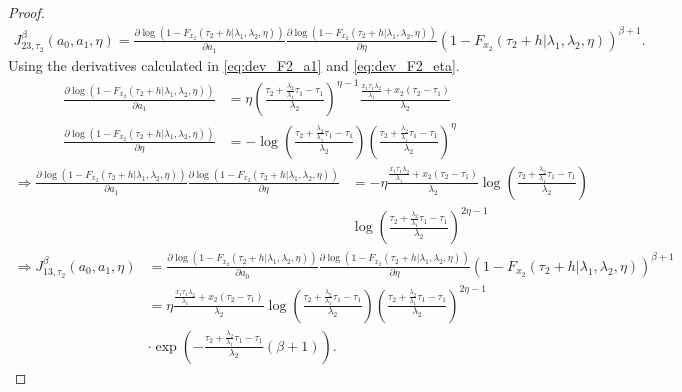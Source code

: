 \documentclass{article}
\begin{document}
\begin{proof}
\begin{align*}
J_{23,\tau_2}^{\beta}(a_0,a_1,\eta)=\frac{\partial \log\left(1-F_{x_2}(\tau_2+h|\lambda_1,\lambda_2,\eta)\right)}{\partial a_1}\frac{\partial \log\left(1-F_{x_2}(\tau_2+h|\lambda_1,\lambda_2,\eta)\right)}{\partial \eta}\left(1-F_{x_2}(\tau_2+h|\lambda_1,\lambda_2,\eta)\right)^{\beta+1}.
\end{align*}
Using the derivatives calculated in  \eqref{eq:dev_F2_a1} and \eqref{eq:dev_F2_eta}.
\begin{align*}
\frac{\partial \log\left(1-F_{x_2}(\tau_2+h|\lambda_1,\lambda_2,\eta)\right)}{\partial a_1}&=\eta\left(\frac{\tau_2+\frac{\lambda_2}{\lambda_1}\tau_1-\tau_1}{\lambda_2}\right)^{\eta-1}\frac{\frac{x_1\tau_1\lambda_2}{\lambda_1}+x_2(\tau_2-\tau_1)}{\lambda_2}
\\
\frac{\partial \log\left(1-F_{x_2}(\tau_2+h|\lambda_1,\lambda_2,\eta)\right)}{\partial \eta}&=-\log\left(\frac{\tau_2+\frac{\lambda_2}{\lambda_1}\tau_1-\tau_1}{\lambda_2}\right)\left(\frac{\tau_2+\frac{\lambda_2}{\lambda_1}\tau_1-\tau_1}{\lambda_2}\right)^{\eta}
\end{align*}
\begin{align*}
\Rightarrow \frac{\partial \log\left(1-F_{x_2}(\tau_2+h|\lambda_1,\lambda_2,\eta)\right)}{\partial a_1}\frac{\partial \log\left(1-F_{x_2}(\tau_2+h|\lambda_1,\lambda_2,\eta)\right)}{\partial \eta}&= -\eta\frac{\frac{x_1\tau_1\lambda_2}{\lambda_1}+x_2(\tau_2-\tau_1)}{\lambda_2}\log\left(\frac{\tau_2+\frac{\lambda_2}{\lambda_1}\tau_1-\tau_1}{\lambda_2}\right)
\\
&\log\left(\frac{\tau_2+\frac{\lambda_2}{\lambda_1}\tau_1-\tau_1}{\lambda_2}\right)^{2\eta-1}
\end{align*}
\begin{align*}
\Rightarrow  J_{13,\tau_2}^{\beta}(a_0,a_1,\eta)&=\frac{\partial \log\left(1-F_{x_2}(\tau_2+h|\lambda_1,\lambda_2,\eta)\right)}{\partial a_0}\frac{\partial \log\left(1-F_{x_2}(\tau_2+h|\lambda_1,\lambda_2,\eta)\right)}{\partial \eta}\left(1-F_{x_2}(\tau_2+h|\lambda_1,\lambda_2,\eta)\right)^{\beta+1}
\\
&=\eta\frac{\frac{x_1\tau_1\lambda_2}{\lambda_1}+x_2(\tau_2-\tau_1)}{\lambda_2}\log\left(\frac{\tau_2+\frac{\lambda_2}{\lambda_1}\tau_1-\tau_1}{\lambda_2}\right)\left(\frac{\tau_2+\frac{\lambda_2}{\lambda_1}\tau_1-\tau_1}{\lambda_2}\right)^{2\eta-1}
\\
&\cdot \exp\left(-\frac{\tau_2+\frac{\lambda_2}{\lambda_1}\tau_1-\tau_1}{\lambda_2}(\beta+1)\right).
\end{align*}
\end{proof}
\end{document}
